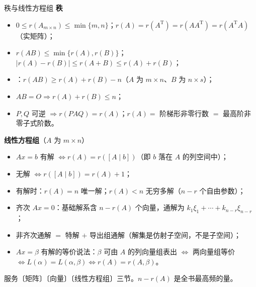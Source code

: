 \begin{fdeep}{秩与线性方程组}
\textbf{秩}
\begin{itemize}[leftmargin=2.2em,itemsep=0.2em]
\item $0\le r(A_{m\times n})\le\min\{m,n\}$；$r(A)=r(A^{\mathrm T})=r(AA^{\mathrm T})=r(A^{\mathrm T}A)$（实矩阵）；
\item $r(AB)\le\min\{r(A),r(B)\}$；$|r(A)-r(B)|\le r(A+B)\le r(A)+r(B)$；
\item {}：$r(AB)\ge r(A)+r(B)-n$（$A$ 为 $m\times n$、$B$ 为 $n\times s$）；
\item $AB=O\Rightarrow r(A)+r(B)\le n$；
\item $P,Q$ 可逆 $\Rightarrow r(PAQ)=r(A)$；$r(A)=$ 阶梯形非零行数 $=$ 最高阶非零子式阶数。
\end{itemize}
\textbf{线性方程组}（$A$ 为 $m\times n$）
\begin{itemize}[leftmargin=2.2em,itemsep=0.2em]
\item $Ax=b$ 有解 $\iff r(A)=r([A\mid b])$（即 $b$ 落在 $A$ 的列空间中）；
\item 无解 $\iff r([A\mid b])=r(A)+1$；
\item 有解时：$r(A)=n$ 唯一解；$r(A)<n$ 无穷多解（$n-r$ 个自由参数）；
\item 齐次 $Ax=0$：基础解系含 $\boxed{n-r(A)}$ 个向量，通解为 $k_1\xi_1+\cdots+k_{n-r}\xi_{n-r}$；
\item 非齐次通解 $=$ 特解 $+$ 导出组通解（解集是仿射子空间，不是子空间）；
\item $Ax=\beta$ 有解的等价说法：$\beta$ 可由 $A$ 的列向量组表出 $\iff$ 两向量组等价
      $\iff L(\alpha)=L(\alpha,\beta)\iff r(A)=r(A,\beta)$。
\end{itemize}
\fbref{}服务〔矩阵〕〔向量〕〔线性方程组〕三节。$n-r(A)$ 是全书最高频的量。
\end{fdeep}

